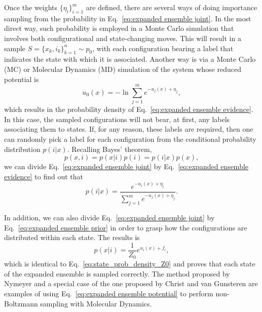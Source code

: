 \documentclass[aip,jcp,reprint,amsmath,amssymb]{revtex4-1}
\begin{document}
Once the weights $\{\eta_i\}_{i=1}^m$ are defined, there are several ways of doing importance sampling from the probability in Eq.~\eqref{eq:expanded ensemble joint}. In the most direct way, such probability is employed in a Monte Carlo simulation that involves both configurational and state-changing moves.\cite{Lyubartsev_1992} This will result in a sample $S = \{x_k,i_k\}_{k=1}^n \sim p_0$, with each configuration bearing a label that indicates the state with which it is associated. Another way is via a Monte Carlo (MC) or Molecular Dynamics (MD) simulation of the system whose reduced potential is
\begin{equation}
\label{eq:expanded ensemble potential}
u_0(x) = - \ln \sum_{j=1}^m e^{-u_j(x) + \eta_j},
\end{equation}
which results in the probability density of Eq.~\eqref{eq:expanded ensemble evidence}. In this case, the sampled configurations will not bear, at first, any labels associating them to states. If, for any reason, these labels are required, then one can randomly pick a label for each configuration from the conditional probability distribution $p(i|x)$.\cite{Nymeyer_2010} Recalling Bayes' theorem,
\begin{equation}
\label{eq:bayer theorem}
p(x,i) = p(x|i) p(i) = p(i|x) p(x),
\end{equation}
we can divide Eq.~\eqref{eq:expanded ensemble joint} by Eq.~\eqref{eq:expanded ensemble evidence} to find out that
\begin{equation}
\label{eq:expanded ensemble posterior}
p(i|x) = \frac{e^{-u_i(x) + \eta_i}}{\sum_{j=1}^m e^{-u_j(x) + \eta_j}}.
\end{equation}

In addition, we can also divide Eq.~\eqref{eq:expanded ensemble joint} by Eq.~\eqref{eq:expanded ensemble prior} in order to grasp how the configurations are distributed within each state. The results is
\begin{equation}
\label{eq:expanded ensemble likelihood}
p(x|i) = \frac{1}{Z_0} e^{u_i(x) + f_i},
\end{equation}
which is identical to Eq.~\eqref{eq:state_prob_density_Z0} and proves that each state of the expanded ensemble is sampled correctly. The method proposed by Nymeyer\cite{Nymeyer_2010} and a special case of the one proposed by Christ and van Gunsteren\cite{Christ_2007, *Christ_2008, *Christ_2009} are examples of using Eq.~\eqref{eq:expanded ensemble potential} to perform non-Boltzmann sampling with Molecular Dynamics.
\end{document}
